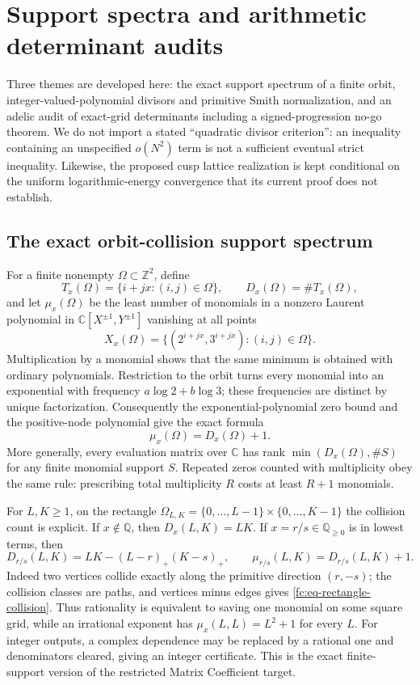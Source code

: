 \documentclass[11pt,oneside]{article}
\theoremstyle{definition}
\theoremstyle{remark}
\newcommand{\Z}{\mathbb Z}
\newcommand{\Q}{\mathbb Q}
\newcommand{\C}{\mathbb C}
\begin{document}
\section{Support spectra and arithmetic determinant audits}
\label{sec:support-determinant-audits}

Three themes are developed here: the exact support spectrum of a finite orbit,
integer-valued-polynomial divisors and primitive Smith normalization, and an adelic audit of
exact-grid determinants including a signed-progression no-go theorem.  We do not import a
stated ``quadratic divisor criterion'': an inequality containing an unspecified
$o(N^2)$ term is not a sufficient eventual strict inequality.  Likewise, the proposed cusp
lattice realization is kept conditional on the uniform logarithmic-energy convergence that
its current proof does not establish.

\subsection{The exact orbit-collision support spectrum}
\label{fc:support-spectrum}

For a finite nonempty $\Omega\subset\Z^2$, define
\[
 T_x(\Omega)=\{i+jx:(i,j)\in\Omega\},\qquad D_x(\Omega)=\#T_x(\Omega),
\]
and let $\mu_x(\Omega)$ be the least number of monomials in a nonzero Laurent polynomial
in $\C[X^{\pm1},Y^{\pm1}]$ vanishing at all points
\[
 X_x(\Omega)=\{(2^{i+jx},3^{i+jx}):(i,j)\in\Omega\}.
\]
Multiplication by a monomial shows that the same minimum is obtained with ordinary
polynomials.  Restriction to the orbit turns every monomial into an exponential with
frequency $a\log2+b\log3$; these frequencies are distinct by unique factorization.
Consequently the exponential-polynomial zero bound and the positive-node polynomial give
the exact formula
\begin{equation}
  \boxed{\mu_x(\Omega)=D_x(\Omega)+1.}
  \label{fc:eq-support-spectrum}
\end{equation}
More generally, every evaluation matrix over $\C$ has rank
$\min(D_x(\Omega),\#S)$ for any finite monomial support $S$.  Repeated zeros counted with
multiplicity obey the same rule: prescribing total multiplicity $R$ costs at least $R+1$
monomials.

For $L,K\ge1$, on the rectangle
$\Omega_{L,K}=\{0,\ldots,L-1\}\times\{0,\ldots,K-1\}$ the collision count is explicit.
If $x\notin\Q$, then $D_x(L,K)=LK$.  If $x=r/s\in\Q_{\ge0}$ is in lowest terms, then
\begin{equation}
 D_{r/s}(L,K)=LK-(L-r)_+(K-s)_+,
 \qquad
 \mu_{r/s}(L,K)=D_{r/s}(L,K)+1.
 \label{fc:eq-rectangle-collision}
\end{equation}
Indeed two vertices collide exactly along the primitive direction $(r,-s)$; the collision
classes are paths, and vertices minus edges gives \eqref{fc:eq-rectangle-collision}.  Thus
rationality is equivalent to saving one monomial on some square grid, while an irrational
exponent has $\mu_x(L,L)=L^2+1$ for every $L$.  For integer outputs, a complex dependence
may be replaced by a rational one and denominators cleared, giving an integer certificate.
This is the exact finite-support version of the restricted Matrix Coefficient target.
\end{document}
